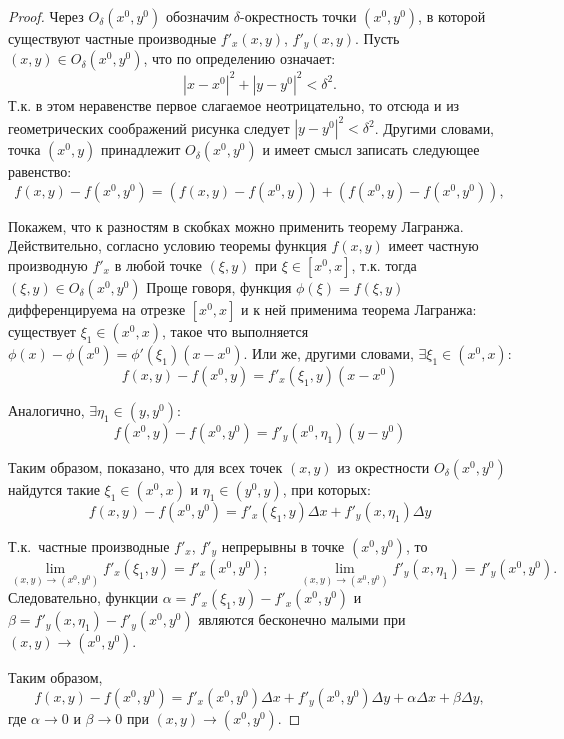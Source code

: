 \begin{proof}
Через $O_\delta(x^0, y^0)$ обозначим $\delta$-окрестность точки $(x^0, y^0)$, в которой существуют частные производные $f'_x(x,y)$, $f'_y(x,y)$. Пусть $(x,y) \in O_\delta(x^0, y^0)$, что по определению означает:
$$
|x - x^0|^2 + |y - y^0|^2 < \delta^2.
$$ 
Т.к. в этом неравенстве первое слагаемое неотрицательно, то отсюда и из геометрических соображений рисунка следует $|y - y^0|^2 < \delta^2$. Другими словами, точка $(x^0, y)$ принадлежит $O_\delta(x^0, y^0)$ и имеет смысл записать следующее равенство:
\begin{equation*}
f(x,y) - f(x^0, y^0) = (f(x,y) - f(x^0, y)) + (f(x^0, y) - f(x^0, y^0)),
\end{equation*}

Покажем, что к разностям в скобках можно применить теорему Лагранжа. Действительно, согласно условию теоремы функция $f(x, y)$ имеет частную производную $f'_x$ в любой точке $(\xi, y)$  при $\xi \in [x^0, x]$, т.к. тогда $(\xi, y) \in O_\delta(x^0, y^0)$ Проще говоря, функция $\phi(\xi)=f(\xi, y)$ дифференцируема на отрезке $[x^0, x]$ и к ней применима теорема Лагранжа: существует $\xi_1 \in (x^0, x)$, такое что выполняется $\phi(x) - \phi(x^0) = \phi'(\xi_1)(x - x^0)$. Или же, другими словами, $\exists \xi_1 \in (x^0, x)$:
$$
f(x,y) - f(x^0, y) = f'_x(\xi_1, y)(x - x^0)
$$

Аналогично, $\exists \eta_1 \in (y, y^0)$:
$$
f(x^0, y) - f(x^0, y^0) = f'_y(x^0, \eta_1)(y - y^0)
$$ 

Таким образом, показано, что для всех точек $(x,y)$ из окрестности $O_\delta(x^0, y^0)$ найдутся такие $\xi_1 \in (x^0, x)$ и $\eta_1 \in (y^0, y)$, при которых:
$$
f(x,y) - f(x^0, y^0) = f'_x(\xi_1, y) \Delta x + f'_y(x, \eta_1) \Delta y
$$

Т.к.~частные производные $f'_x$, $f'_y$ непрерывны в точке $(x^0, y^0)$, то 
$$
\lim\limits_{(x,y) \to (x^0, y^0)} f'_x(\xi_1, y) = f'_x(x^0, y^0);\qquad 
\lim\limits_{(x,y) \to (x^0, y^0)} f'_y(x, \eta_1) = f'_y(x^0, y^0).
$$
Следовательно, функции $\alpha =  f'_x(\xi_1, y) - f'_x(x^0, y^0)$ и $\beta =  f'_y(x, \eta_1) - f'_y(x^0, y^0)$ являются бесконечно малыми при $(x,y) \to (x^0, y^0)$. 

Таким образом,
$$
f(x,y) - f(x^0, y^0) = f'_x(x^0, y^0) \Delta x + f'_y(x^0, y^0) \Delta y + \alpha \Delta x + \beta \Delta y,
$$
где $\alpha \to 0$ и $\beta \to 0$ при $(x,y)\to(x^0,y^0)$.


\end{proof}
